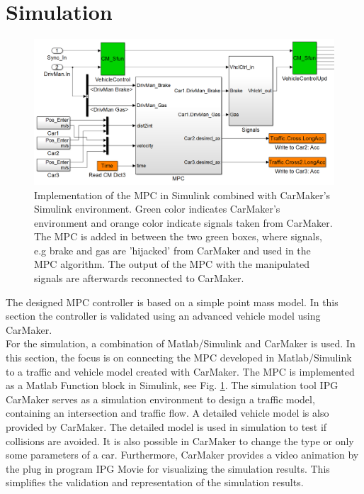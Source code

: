 \documentclass[letterpaper,10pt,conference]{ieeeconf}
\begin{document}
\section{Simulation} \label{sec:simulation}
\begin{figure}[]
    \centering
    \includegraphics[width=1.8\columnwidth]{CarMaker_Implement2.png}
    \caption{Implementation of the MPC in Simulink combined with CarMaker's Simulink environment. Green color indicates CarMaker's environment and orange color indicate signals taken from CarMaker. The MPC is added in between the two green boxes, where signals, e.g brake and gas are 'hijacked' from CarMaker and used in the MPC algorithm. The output of the MPC with the manipulated signals are afterwards reconnected to CarMaker.}
    \label{fig:CM_Implement}
\end{figure}
The designed MPC controller is based on a simple point mass model. In this section the controller is validated using an advanced vehicle model using CarMaker.\\ \indent
For the simulation, a combination of Matlab/Simulink and CarMaker is used. In this section, the focus is on connecting the MPC developed in Matlab/Simulink to a traffic and vehicle model created with CarMaker. The MPC is implemented as a Matlab Function block in Simulink, see Fig. \ref{fig:CM_Implement}. The simulation tool IPG CarMaker serves as a simulation environment to design a traffic model, containing an intersection and traffic flow. A detailed vehicle model is also provided by CarMaker. The detailed model is used in simulation to test if collisions are avoided. It is also possible in CarMaker to change the type or only some parameters of a car. Furthermore, CarMaker provides a video animation by the plug in program IPG Movie for visualizing the simulation results. This simplifies the validation and representation of the simulation results.
\end{document}
